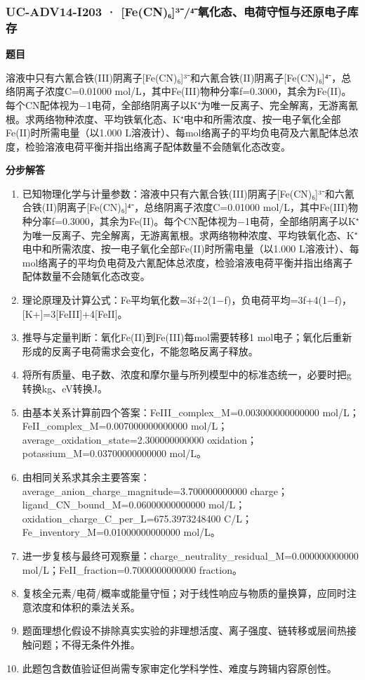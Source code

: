 \documentclass[UTF8,11pt,a4paper]{ctexart}
\begin{document}
\subsubsection*{UC-ADV14-I203 · [Fe(CN)₆]³⁻/⁴⁻氧化态、电荷守恒与还原电子库存}
\noindent\textbf{题目}\par
溶液中只有六氰合铁(III)阴离子[Fe(CN)₆]³⁻和六氰合铁(II)阴离子[Fe(CN)₆]⁴⁻，总络阴离子浓度C=0.01000 mol/L，其中Fe(III)物种分率f=0.3000，其余为Fe(II)。每个CN配体视为−1电荷，全部络阴离子以K⁺为唯一反离子、完全解离，无游离氰根。求两络物种浓度、平均铁氧化态、K⁺电中和所需浓度、按一电子氧化全部Fe(II)时所需电量（以1.000 L溶液计）、每mol络离子的平均负电荷及六氰配体总浓度，检验溶液电荷平衡并指出络离子配体数量不会随氧化态改变。\par
\medskip\noindent\textbf{分步解答}
\begin{enumerate}
\item 已知物理化学与计量参数：溶液中只有六氰合铁(III)阴离子[Fe(CN)₆]³⁻和六氰合铁(II)阴离子[Fe(CN)₆]⁴⁻，总络阴离子浓度C=0.01000 mol/L，其中Fe(III)物种分率f=0.3000，其余为Fe(II)。每个CN配体视为−1电荷，全部络阴离子以K⁺为唯一反离子、完全解离，无游离氰根。求两络物种浓度、平均铁氧化态、K⁺电中和所需浓度、按一电子氧化全部Fe(II)时所需电量（以1.000 L溶液计）、每mol络离子的平均负电荷及六氰配体总浓度，检验溶液电荷平衡并指出络离子配体数量不会随氧化态改变。
\item 理论原理及计算公式：Fe平均氧化数=3f+2(1−f)，负电荷平均=3f+4(1−f)，[K+]=3[FeIII]+4[FeII]。
\item 推导与定量判断：氧化Fe(II)到Fe(III)每mol需要转移1 mol电子；氧化后重新形成的反离子电荷需求会变化，不能忽略反离子释放。
\item 将所有质量、电子数、浓度和摩尔量与所列模型中的标准态统一，必要时把g转换kg、eV转换J。
\item 由基本关系计算前四个答案：FeIII\_complex\_M=0.003000000000000 mol/L；FeII\_complex\_M=0.007000000000000 mol/L；average\_oxidation\_state=2.300000000000 oxidation；potassium\_M=0.03700000000000 mol/L。
\item 由相同关系求其余主要答案：average\_anion\_charge\_magnitude=3.700000000000 charge；ligand\_CN\_bound\_M=0.06000000000000 mol/L；oxidation\_charge\_C\_per\_L=675.3973248400 C/L；Fe\_inventory\_M=0.01000000000000 mol/L。
\item 进一步复核与最终可观察量：charge\_neutrality\_residual\_M=0.000000000000 mol/L；FeII\_fraction=0.7000000000000 fraction。
\item 复核全元素/电荷/概率或能量守恒；对于线性响应与物质的量换算，应同时注意浓度和体积的乘法关系。
\item 题面理想化假设不排除真实实验的非理想活度、离子强度、链转移或层间热接触问题；不得无条件外推。
\item 此题包含数值验证但尚需专家审定化学科学性、难度与跨辑内容原创性。
\end{enumerate}
\end{document}
